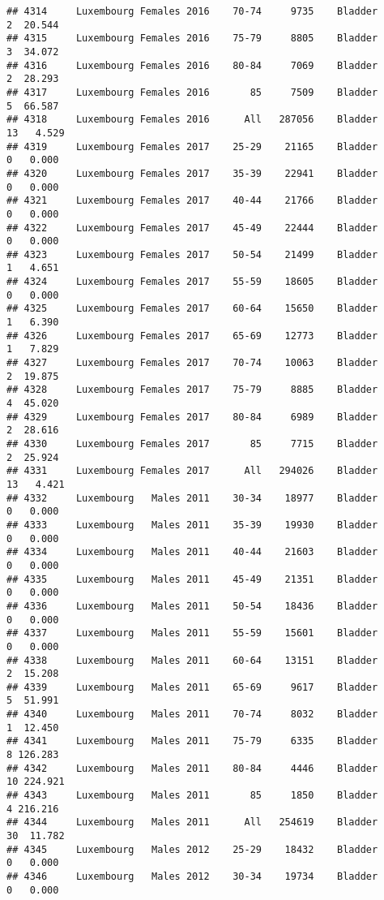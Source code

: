 \documentclass[
]{article}
\begin{document}
\begin{verbatim}
## 4314     Luxembourg Females 2016    70-74     9735    Bladder      2  20.544
## 4315     Luxembourg Females 2016    75-79     8805    Bladder      3  34.072
## 4316     Luxembourg Females 2016    80-84     7069    Bladder      2  28.293
## 4317     Luxembourg Females 2016       85     7509    Bladder      5  66.587
## 4318     Luxembourg Females 2016      All   287056    Bladder     13   4.529
## 4319     Luxembourg Females 2017    25-29    21165    Bladder      0   0.000
## 4320     Luxembourg Females 2017    35-39    22941    Bladder      0   0.000
## 4321     Luxembourg Females 2017    40-44    21766    Bladder      0   0.000
## 4322     Luxembourg Females 2017    45-49    22444    Bladder      0   0.000
## 4323     Luxembourg Females 2017    50-54    21499    Bladder      1   4.651
## 4324     Luxembourg Females 2017    55-59    18605    Bladder      0   0.000
## 4325     Luxembourg Females 2017    60-64    15650    Bladder      1   6.390
## 4326     Luxembourg Females 2017    65-69    12773    Bladder      1   7.829
## 4327     Luxembourg Females 2017    70-74    10063    Bladder      2  19.875
## 4328     Luxembourg Females 2017    75-79     8885    Bladder      4  45.020
## 4329     Luxembourg Females 2017    80-84     6989    Bladder      2  28.616
## 4330     Luxembourg Females 2017       85     7715    Bladder      2  25.924
## 4331     Luxembourg Females 2017      All   294026    Bladder     13   4.421
## 4332     Luxembourg   Males 2011    30-34    18977    Bladder      0   0.000
## 4333     Luxembourg   Males 2011    35-39    19930    Bladder      0   0.000
## 4334     Luxembourg   Males 2011    40-44    21603    Bladder      0   0.000
## 4335     Luxembourg   Males 2011    45-49    21351    Bladder      0   0.000
## 4336     Luxembourg   Males 2011    50-54    18436    Bladder      0   0.000
## 4337     Luxembourg   Males 2011    55-59    15601    Bladder      0   0.000
## 4338     Luxembourg   Males 2011    60-64    13151    Bladder      2  15.208
## 4339     Luxembourg   Males 2011    65-69     9617    Bladder      5  51.991
## 4340     Luxembourg   Males 2011    70-74     8032    Bladder      1  12.450
## 4341     Luxembourg   Males 2011    75-79     6335    Bladder      8 126.283
## 4342     Luxembourg   Males 2011    80-84     4446    Bladder     10 224.921
## 4343     Luxembourg   Males 2011       85     1850    Bladder      4 216.216
## 4344     Luxembourg   Males 2011      All   254619    Bladder     30  11.782
## 4345     Luxembourg   Males 2012    25-29    18432    Bladder      0   0.000
## 4346     Luxembourg   Males 2012    30-34    19734    Bladder      0   0.000

\end{verbatim}
\end{document}
